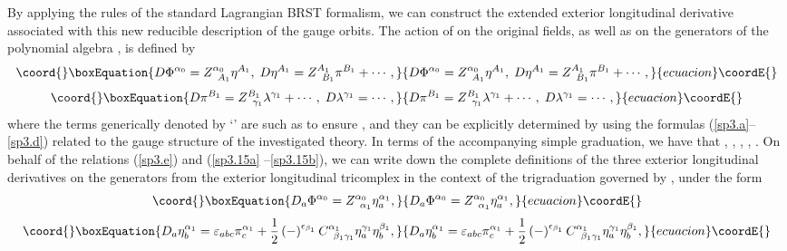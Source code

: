 \documentclass[a4paper,12pt]{article}
\begin{document}
By applying the rules of the standard Lagrangian BRST formalism, we can
construct the extended exterior longitudinal derivative \coordHE{} associated with
this new reducible description of the gauge orbits. The action of \coordHE{} on the
original fields, as well as on the generators of the polynomial algebra \coordHE{}, is defined by 
\begin{equation}\coord{}\boxEquation{
D\Phi ^{\alpha _{0}}=Z_{\;\;A_{1}}^{\alpha _{0}}\eta ^{A_{1}},\;D\eta
^{A_{1}}=Z_{\;\;B_{1}}^{A_{1}}\pi ^{B_{1}}+\cdots ,  \label{sp3.15a}
}{
D\Phi ^{\alpha _{0}}=Z_{\;\;A_{1}}^{\alpha _{0}}\eta ^{A_{1}},\;D\eta
^{A_{1}}=Z_{\;\;B_{1}}^{A_{1}}\pi ^{B_{1}}+\cdots ,  }{ecuacion}\coordE{}\end{equation}
\begin{equation}\coord{}\boxEquation{
D\pi ^{B_{1}}=Z_{\;\;\gamma _{1}}^{B_{1}}\lambda ^{\gamma _{1}}+\cdots
,\;D\lambda ^{\gamma _{1}}=\cdots ,  \label{sp3.15b}
}{
D\pi ^{B_{1}}=Z_{\;\;\gamma _{1}}^{B_{1}}\lambda ^{\gamma _{1}}+\cdots
,\;D\lambda ^{\gamma _{1}}=\cdots ,  }{ecuacion}\coordE{}\end{equation}
where the terms generically denoted by `\myHighlight{$\cdots $}\coordHE{}' are such as to ensure \coordHE{}, and they can be explicitly determined by using the formulas
(\ref{sp3.a}--\ref{sp3.d}) related to the gauge structure of the
investigated theory. In terms of the accompanying simple graduation, we have
that \coordHE{}, \coordHE{}, \coordHE{}, \coordHE{}, \coordHE{}. On behalf of the relations (\ref{sp3.e}) and (\ref{sp3.15a}%
--\ref{sp3.15b}), we can write down the complete definitions of the three
exterior longitudinal derivatives on the generators from the exterior
longitudinal tricomplex in the context of the trigraduation governed by \coordHE{}, under the form 
\begin{equation}\coord{}\boxEquation{
D_{a}\Phi ^{\alpha _{0}}=Z_{\;\;\alpha _{1}}^{\alpha _{0}}\eta _{a}^{\alpha
_{1}},  \label{sp3.18}
}{
D_{a}\Phi ^{\alpha _{0}}=Z_{\;\;\alpha _{1}}^{\alpha _{0}}\eta _{a}^{\alpha
_{1}},  }{ecuacion}\coordE{}\end{equation}
\begin{equation}\coord{}\boxEquation{
D_{a}\eta _{b}^{\alpha _{1}}=\varepsilon _{abc}\pi _{c}^{\alpha _{1}}+\frac{1
}{2}\left( -\right) ^{\epsilon _{\beta _{1}}}C_{\;\;\beta _{1}\gamma
_{1}}^{\alpha _{1}}\eta _{a}^{\gamma _{1}}\eta _{b}^{\beta _{1}},
\label{sp3.19}
}{
D_{a}\eta _{b}^{\alpha _{1}}=\varepsilon _{abc}\pi _{c}^{\alpha _{1}}+\frac{1
}{2}\left( -\right) ^{\epsilon _{\beta _{1}}}C_{\;\;\beta _{1}\gamma
_{1}}^{\alpha _{1}}\eta _{a}^{\gamma _{1}}\eta _{b}^{\beta _{1}},
}{ecuacion}\coordE{}\end{equation}
\end{document}
